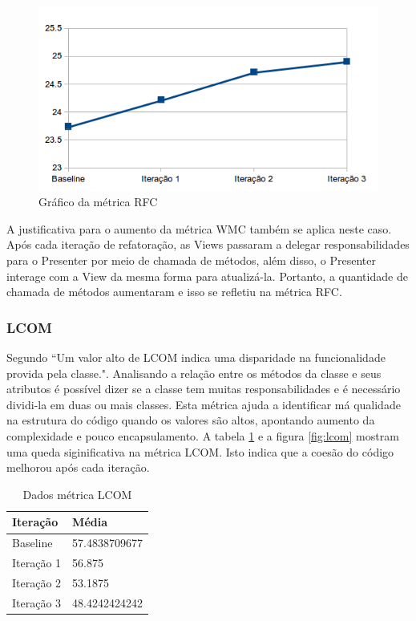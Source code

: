 \documentclass[conference]{IEEEtran}
\begin{document}
\begin{figure}[htb]
	\begin{center}
		\includegraphics[scale=0.5]{img/rfc.png}
	\end{center}
	\caption{\label{fig:rfc} Gráfico da métrica RFC}   
	
\end{figure}


A justificativa para o aumento da métrica WMC também se aplica neste caso.
Após cada iteração de refatoração, as Views passaram a delegar
responsabilidades para o Presenter por meio de chamada de métodos, além disso, o Presenter interage com a
View da mesma forma para atualizá-la. Portanto, a quantidade de chamada de
métodos aumentaram e isso se refletiu na métrica RFC.

\subsubsection{LCOM}

Segundo \cite{cksuite} ``Um valor alto de LCOM indica uma disparidade na
funcionalidade provida pela classe.". Analisando a relação entre os métodos da
classe e seus atributos é possível dizer se a classe tem muitas
responsabilidades e é necessário dividi-la em duas ou mais classes. Esta métrica
ajuda a identificar má qualidade na estrutura do código quando os valores são
altos, apontando aumento da complexidade e pouco encapsulamento. A tabela
\ref{tab:lcom} e a figura \ref{fig:lcom} mostram uma queda siginificativa na
métrica LCOM. Isto indica que a coesão do código melhorou após cada iteração.

\begin{table}[!h]
	\centering
	    \caption{\label{tab:lcom} Dados métrica LCOM}
    \begin{tabular}{ | l | l | }
    \hline
    Iteração & Média 			\\ \hline
    Baseline & 57.4838709677   	\\ \hline
    Iteração 1 & 56.875			\\ \hline
	Iteração 2 & 53.1875		\\ \hline
	Iteração 3 & 48.4242424242	\\ \hline
    \end{tabular}
    
\end{table}
\end{document}
